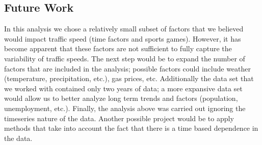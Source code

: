 \documentclass[12pt]{article}
\begin{document}
\subsection{Future Work}
In this analysis we chose a relatively small subset of factors that we believed would impact traffic speed (time factors and sports games). However, it has become apparent that these factors are not sufficient to fully capture the variability of traffic speeds. The next step would be to expand the number of factors that are included in the analysis; possible factors could include weather (temperature, precipitation, etc.), gas prices, etc. Additionally the data set that we worked with contained only two years of data; a more expansive data set would allow us to better analyze long term trends and factors (population, unemployment, etc.). 
Finally, the analysis above was carried out ignoring the timeseries nature of the data. Another possible project would be to apply methods that take into account the fact that there is a time based dependence in the data.
\onecolumn
\end{document}
